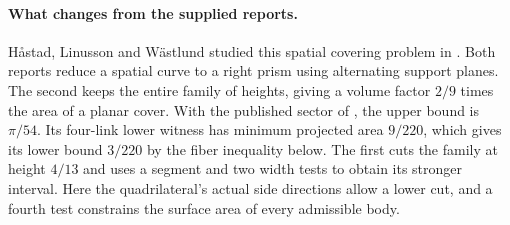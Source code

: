 \documentclass[11pt,letterpaper]{article}
\begin{document}
\paragraph{What changes from the supplied reports.}
H\aa stad, Linusson and W\"astlund studied this spatial covering problem in \cite{hlw}. Both reports reduce a spatial curve to a right prism using alternating support planes. The second keeps the entire family of heights, giving a volume factor $2/9$ times the area of a planar cover. With the published sector of \cite{sector}, the upper bound is $\pi/54$. Its four-link lower witness has minimum projected area $9/220$, which gives its lower bound $3/220$ by the fiber inequality below. The first cuts the family at height $4/13$ and uses a segment and two width tests to obtain its stronger interval. Here the quadrilateral's actual side directions allow a lower cut, and a fourth test constrains the surface area of every admissible body.
\clearpage

\clearpage



\end{document}
